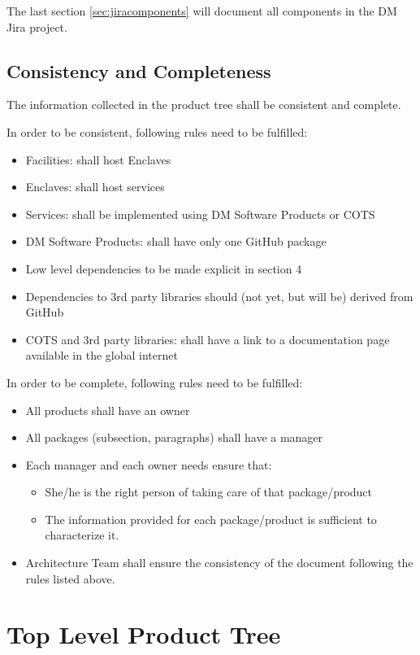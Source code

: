 The last section \ref{sec:jiracomponents} will document all components in the DM Jira project.
 

\subsection{Consistency and Completeness}\label{sec:cons-comp}

The information collected in the product tree shall be consistent and complete.

In order to be consistent, following rules need to be fulfilled:

\begin{itemize}
\item Facilities: shall host Enclaves
\item Enclaves: shall host services
\item Services: shall be implemented using DM Software Products or COTS
\item DM Software Products: shall have only one GitHub package
\item Low level dependencies to be made explicit in section 4
\item Dependencies to 3rd party libraries should (not yet, but will be) derived from GitHub
\item COTS and 3rd party libraries: shall have a link to a documentation page available in the global internet
\end{itemize}

In order to be complete, following rules need to be fulfilled:

\begin{itemize}
\item All products shall have an owner
\item All packages (subsection, paragraphs) shall have a manager
\item Each manager and each owner needs ensure that:
\begin{itemize}
\item She/he is the right person of taking care of that package/product
\item The information provided for each package/product is sufficient to characterize it.
\end{itemize}
\item Architecture Team shall ensure the consistency of the document following the rules listed above.
\end{itemize}


\newpage
\section{Top Level Product Tree}\label{sec:top}

